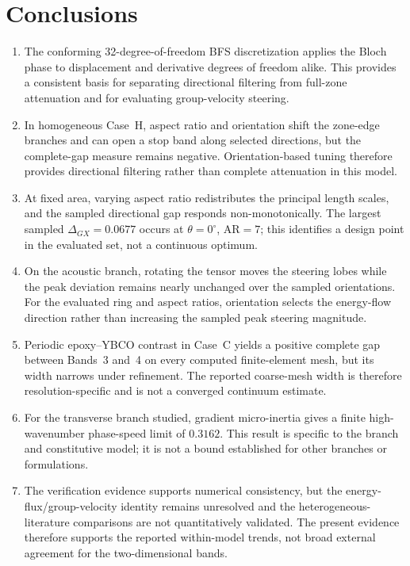 \section{Conclusions}
\label{sec:conclusions}

\begin{enumerate}[label=\arabic*.,leftmargin=*,itemsep=0.45em,parsep=0pt,topsep=0.25em,partopsep=0pt]
  \item The conforming 32-degree-of-freedom BFS discretization applies the Bloch phase to displacement and derivative degrees of freedom alike. This provides a consistent basis for separating directional filtering from full-zone attenuation and for evaluating group-velocity steering.
  \item In homogeneous Case~H, aspect ratio and orientation shift the zone-edge branches and can open a stop band along selected directions, but the complete-gap measure remains negative. Orientation-based tuning therefore provides directional filtering rather than complete attenuation in this model.
  \item At fixed area, varying aspect ratio redistributes the principal length scales, and the sampled directional gap responds non-monotonically. The largest sampled $\Delta_{GX}=0.0677$ occurs at $\theta=0^\circ$, $\mathrm{AR}=7$; this identifies a design point in the evaluated set, not a continuous optimum.
  \item On the acoustic branch, rotating the tensor moves the steering lobes while the peak deviation remains nearly unchanged over the sampled orientations. For the evaluated ring and aspect ratios, orientation selects the energy-flow direction rather than increasing the sampled peak steering magnitude.
  \item Periodic epoxy--YBCO contrast in Case~C yields a positive complete gap between Bands~3 and~4 on every computed finite-element mesh, but its width narrows under refinement. The reported coarse-mesh width is therefore resolution-specific and is not a converged continuum estimate.
  \item For the transverse branch studied, gradient micro-inertia gives a finite high-wavenumber phase-speed limit of $0.3162$. This result is specific to the branch and constitutive model; it is not a bound established for other branches or formulations.
  \item The verification evidence supports numerical consistency, but the energy-flux/group-velocity identity remains unresolved and the heterogeneous-literature comparisons are not quantitatively validated. The present evidence therefore supports the reported within-model trends, not broad external agreement for the two-dimensional bands.
\end{enumerate}

